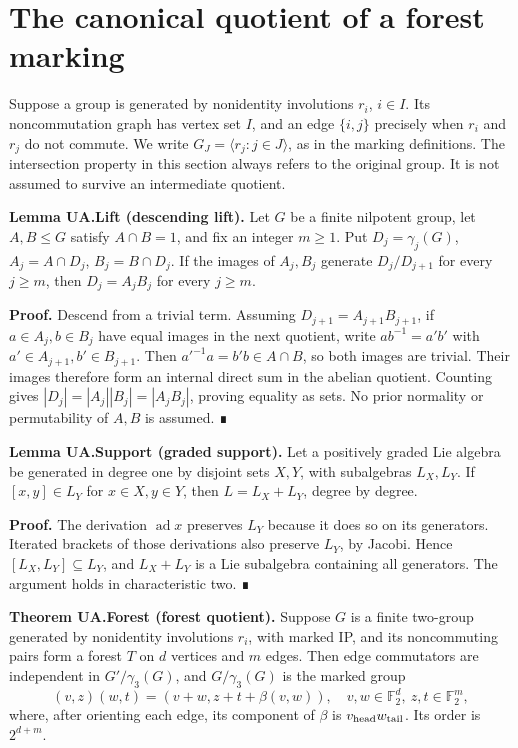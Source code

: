 \section{The canonical quotient of a forest marking}\label{the-canonical-quotient-of-a-forest-marking}

Suppose a group is generated by nonidentity involutions \(r_i\),
\(i\in I\). Its noncommutation graph has vertex set \(I\), and an edge
\(\{i,j\}\) precisely when \(r_i\) and \(r_j\) do not commute. We write
\(G_J=\langle r_j:j\in J\rangle\), as in the marking definitions. The intersection
property in this section always refers to the original group. It is not
assumed to survive an intermediate quotient.

\textbf{Lemma UA.Lift (descending lift).} Let \(G\) be a finite
nilpotent group, let \(A,B\le G\) satisfy \(A\cap B=1\), and fix an
integer \(m\ge1\). Put \(D_j=\gamma_j(G)\), \(A_j=A\cap D_j\),
\(B_j=B\cap D_j\). If the images of \(A_j,B_j\) generate \(D_j/D_{j+1}\)
for every \(j\ge m\), then \(D_j=A_jB_j\) for every \(j\ge m\).

\textbf{Proof.} Descend from a trivial term. Assuming
\(D_{j+1}=A_{j+1}B_{j+1}\), if \(a\in A_j,b\in B_j\) have equal images
in the next quotient, write \(ab^{-1}=a'b'\) with
\(a'\in A_{j+1},b'\in B_{j+1}\). Then \(a'^{-1}a=b'b\in A\cap B\), so
both images are trivial. Their images therefore form an internal direct
sum in the abelian quotient. Counting gives
\(|D_j|=|A_j||B_j|=|A_jB_j|\), proving equality as sets. No prior
normality or permutability of \(A,B\) is assumed. ∎

\textbf{Lemma UA.Support (graded support).} Let a positively graded Lie
algebra be generated in degree one by disjoint sets \(X,Y\), with
subalgebras \(L_X,L_Y\). If \([x,y]\in L_Y\) for \(x\in X,y\in Y\), then
\(L=L_X+L_Y\), degree by degree.

\textbf{Proof.} The derivation \(\operatorname{ad}x\) preserves \(L_Y\)
because it does so on its generators. Iterated brackets of those
derivations also preserve \(L_Y\), by Jacobi. Hence
\([L_X,L_Y]\subseteq L_Y\), and \(L_X+L_Y\) is a Lie subalgebra
containing all generators. The argument holds in characteristic two. ∎

\textbf{Theorem UA.Forest (forest quotient).} Suppose \(G\) is a finite
two-group generated by nonidentity involutions \(r_i\), with marked IP,
and its noncommuting pairs form a forest \(T\) on \(d\) vertices and
\(m\) edges. Then edge commutators are independent in
\(G'/\gamma_3(G)\), and \(G/\gamma_3(G)\) is the marked group \[
 (v,z)(w,t)=(v+w,z+t+\beta(v,w)),\quad
 v,w\in\mathbb F_2^d,\ z,t\in\mathbb F_2^m,               \tag{F0}
\] where, after orienting each edge, its component of \(\beta\) is
\(v_{\rm head}w_{\rm tail}\). Its order is \(2^{d+m}\).


